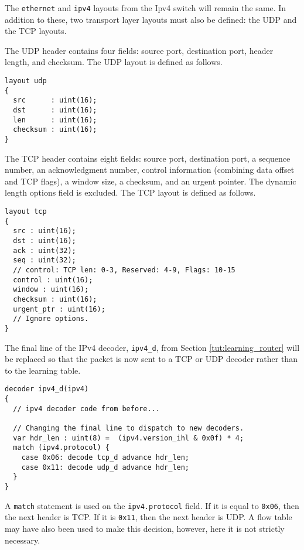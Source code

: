 The \texttt{ethernet} and \texttt{ipv4} layouts from the Ipv4 switch will remain the same. In addition to these, two transport layer layouts must also be defined: the UDP and the TCP layouts.

The UDP header \cite{udp_std} contains four fields: source port, destination port, header length, and checksum. The UDP layout is defined as follows.

\begin{codepage}
\begin{lstlisting}
layout udp
{
  src      : uint(16);
  dst      : uint(16);
  len      : uint(16);
  checksum : uint(16);
}
\end{lstlisting}
\end{codepage}

The TCP header \cite{tcp_std} contains eight fields: source port, destination port, a sequence number, an acknowledgment number, control information (combining data offset and TCP flags), a window size, a checksum, and an urgent pointer. The dynamic length options field is excluded. The TCP layout is defined as follows.

\begin{codepage}
\begin{lstlisting}
layout tcp
{
  src : uint(16);
  dst : uint(16);
  ack : uint(32);
  seq : uint(32);
  // control: TCP len: 0-3, Reserved: 4-9, Flags: 10-15
  control : uint(16); 
  window : uint(16);
  checksum : uint(16);
  urgent_ptr : uint(16);
  // Ignore options.
}
\end{lstlisting}
\end{codepage}

The final line of the IPv4 decoder, \texttt{ipv4\_d}, from Section \ref{tut:learning_router} will be replaced so that the packet is now sent to a TCP or UDP decoder rather than to the learning table.

\begin{codepage}
\begin{lstlisting}
decoder ipv4_d(ipv4)
{
  // ipv4 decoder code from before...
  
  // Changing the final line to dispatch to new decoders.
  var hdr_len : uint(8) =  (ipv4.version_ihl & 0x0f) * 4;
  match (ipv4.protocol) {
    case 0x06: decode tcp_d advance hdr_len;
    case 0x11: decode udp_d advance hdr_len;
  }
}
\end{lstlisting}
\end{codepage} 


A \texttt{match} statement is used on the \texttt{ipv4.protocol} field. If it is equal to \texttt{0x06}, then the next header is TCP. If it is \texttt{0x11}, then the next header is UDP. A flow table may have also been used to make this decision, however, here it is not strictly necessary.

